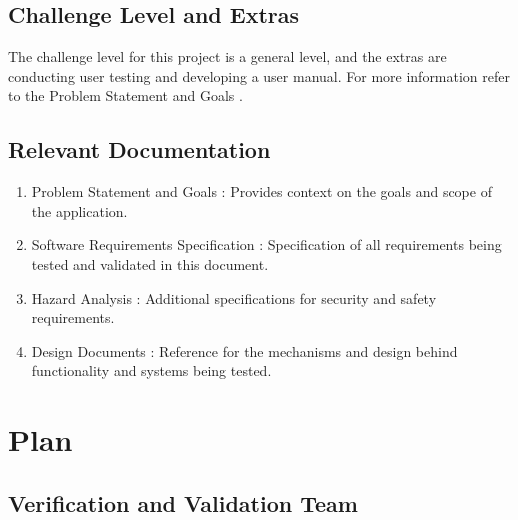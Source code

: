 \documentclass[12pt, titlepage]{article}
\begin{document}
\subsection{Challenge Level and Extras}

The challenge level for this project is a general level, and the
extras are conducting user testing and developing a user manual. For
more information refer to the Problem Statement and Goals
\citep[\textit{Challenge Level and Extras}]{ProblemStatement}.

\subsection{Relevant Documentation}

\begin{enumerate}
  \item Problem Statement and Goals \citep{ProblemStatement}:
    Provides context on the goals and scope of the application.
  \item Software Requirements Specification :
    Specification of all requirements being tested and validated in
    this document.
  \item Hazard Analysis : Additional
    specifications for security and safety requirements.
  \item Design Documents : Reference for the
    mechanisms and design behind functionality and systems being tested.
\end{enumerate}

\section{Plan}


\subsection{Verification and Validation Team}
\end{document}
